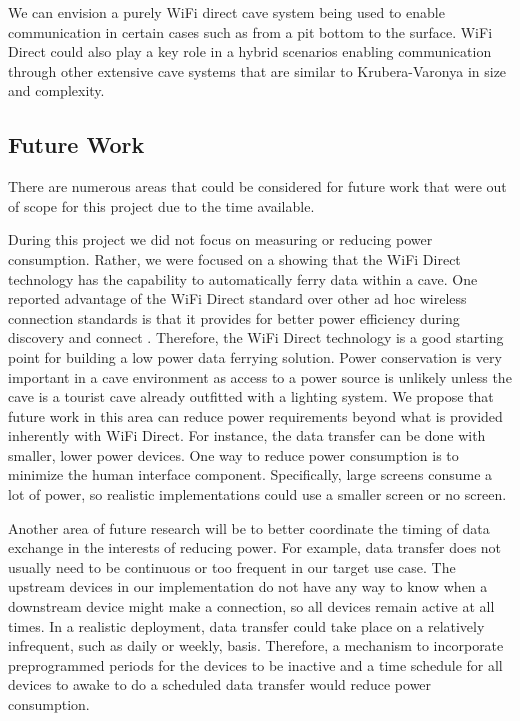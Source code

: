 \documentclass[10pt,twocolumn]{article}
\begin{document}
We can envision a purely WiFi direct cave system being used to enable communication in certain cases such as from a pit bottom to the surface.
WiFi Direct could also play a key role in a hybrid scenarios enabling communication through other extensive cave systems that are similar to Krubera-Varonya in size and complexity. 

\subsection{Future Work}
\label{sec:Future Work}
There are numerous areas that could be considered for future work that were out of scope for this project due to the time available.

During this project we did not focus on measuring or reducing power consumption.
Rather, we were focused on a showing that the WiFi Direct technology has the capability to automatically ferry data within a cave.
One reported advantage of the WiFi Direct standard over other ad hoc wireless connection standards is that it provides for better power efficiency during discovery and connect \cite{wifiwhitepaper}.
Therefore, the WiFi Direct technology is a good starting point for building a low power data ferrying solution.
Power conservation is very important in a cave environment as access to a power source is unlikely unless the cave is a tourist cave already outfitted with a lighting system.
We propose that future work in this area can reduce power requirements beyond what is provided inherently with WiFi Direct.
For instance, the data transfer can be done with smaller, lower power devices.
One way to reduce power consumption is to minimize the human interface component.
Specifically, large screens consume a lot of power, so realistic implementations could use a smaller screen or no screen.

Another area of future research will be to better coordinate the timing of data exchange in the interests of reducing power.
For example, data transfer does not usually need to be continuous or too frequent in our target use case.
The upstream devices in our implementation do not have any way to know when a downstream device might make a connection, so all devices remain active at all times.
In a realistic deployment, data transfer could take place on a relatively infrequent, such as daily or weekly, basis.
Therefore, a mechanism to incorporate preprogrammed periods for the devices to be inactive
and a time schedule for all devices to awake to do a scheduled data transfer would reduce power consumption.
\end{document}
